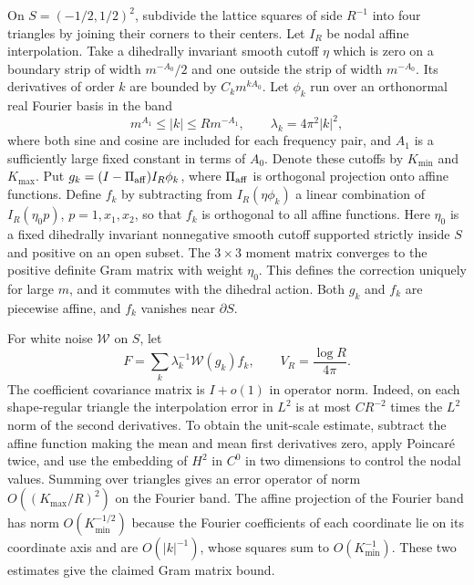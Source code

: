 \documentclass[11pt]{article}
\newcommand{\1}{\mathbf{1}}
\numberwithin{equation}{section}
\begin{document}
On \(S=(-1/2,1/2)^2\), subdivide the lattice squares of side
\(R^{-1}\) into four triangles by joining their corners to their
centers. Let \(I_R\) be nodal affine interpolation. Take a
dihedrally invariant smooth cutoff \(\eta\) which is zero on a
boundary strip of width \(m^{-A_0}/2\) and one outside the strip of
width \(m^{-A_0}\). Its derivatives of order \(k\) are bounded by
\(C_k m^{kA_0}\). Let \(\phi_k\) run over an orthonormal real
Fourier basis in the band
\[
 m^{A_1}\le |k|\le Rm^{-A_1},\qquad \lambda_k=4\pi^2|k|^2 ,
\]
where both sine and cosine are included for each frequency pair,
and \(A_1\) is a sufficiently large fixed constant in terms of
\(A_0\). Denote these cutoffs by \(K_{\min}\) and \(K_{\max}\).
Put \(g_k=(I-\Pi_{\rm aff})I_R\phi_k\), where \(\Pi_{\rm aff}\)
is orthogonal projection onto affine functions. Define \(f_k\)
by subtracting from \(I_R(\eta\phi_k)\) a linear combination of
\(I_R(\eta_0p)\), \(p=1,x_1,x_2\), so that \(f_k\) is orthogonal to
all affine functions. Here \(\eta_0\) is a fixed dihedrally invariant
nonnegative smooth cutoff supported strictly inside \(S\) and
positive on an open subset. The \(3\times3\) moment matrix
converges to the positive definite Gram matrix with weight
\(\eta_0\). This defines the correction uniquely for large \(m\),
and it commutes with the dihedral action. Both \(g_k\) and \(f_k\)
are piecewise affine, and \(f_k\) vanishes near \(\partial S\).

For white noise \(\mathcal W\) on \(S\), let
\[
 F=\sum_k \lambda_k^{-1}\mathcal W(g_k)f_k,\qquad
 V_R=\frac{\log R}{4\pi}.
\]
The coefficient covariance matrix is \(I+o(1)\) in operator norm.
Indeed, on each shape-regular triangle the interpolation error in
\(L^2\) is at most \(CR^{-2}\) times the \(L^2\) norm of the
second derivatives. To obtain the unit-scale estimate, subtract
the affine function making the mean and mean first derivatives
zero, apply Poincar\'e twice, and use the embedding of \(H^2\)
in \(C^0\) in two dimensions to control the nodal values. Summing
over triangles gives an error operator of norm
\(O((K_{\max}/R)^2)\) on the Fourier band. The affine projection
of the Fourier band has norm \(O(K_{\min}^{-1/2})\) because the Fourier
coefficients of each coordinate lie on its coordinate axis
and are \(O(|k|^{-1})\), whose squares sum to
\(O(K_{\min}^{-1})\). These two estimates give the claimed Gram
matrix bound.
\end{document}
